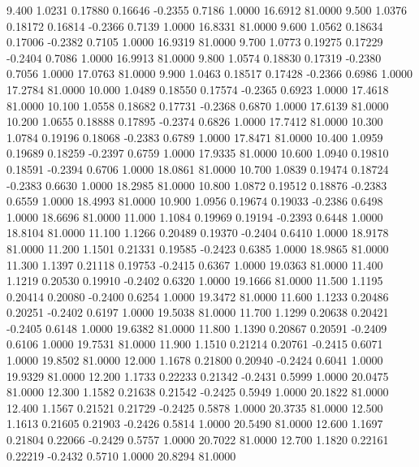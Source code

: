    9.400   1.0231   0.17880   0.16646  -0.2355   0.7186   1.0000  16.6912  81.0000
   9.500   1.0376   0.18172   0.16814  -0.2366   0.7139   1.0000  16.8331  81.0000
   9.600   1.0562   0.18634   0.17006  -0.2382   0.7105   1.0000  16.9319  81.0000
   9.700   1.0773   0.19275   0.17229  -0.2404   0.7086   1.0000  16.9913  81.0000
   9.800   1.0574   0.18830   0.17319  -0.2380   0.7056   1.0000  17.0763  81.0000
   9.900   1.0463   0.18517   0.17428  -0.2366   0.6986   1.0000  17.2784  81.0000
  10.000   1.0489   0.18550   0.17574  -0.2365   0.6923   1.0000  17.4618  81.0000
  10.100   1.0558   0.18682   0.17731  -0.2368   0.6870   1.0000  17.6139  81.0000
  10.200   1.0655   0.18888   0.17895  -0.2374   0.6826   1.0000  17.7412  81.0000
  10.300   1.0784   0.19196   0.18068  -0.2383   0.6789   1.0000  17.8471  81.0000
  10.400   1.0959   0.19689   0.18259  -0.2397   0.6759   1.0000  17.9335  81.0000
  10.600   1.0940   0.19810   0.18591  -0.2394   0.6706   1.0000  18.0861  81.0000
  10.700   1.0839   0.19474   0.18724  -0.2383   0.6630   1.0000  18.2985  81.0000
  10.800   1.0872   0.19512   0.18876  -0.2383   0.6559   1.0000  18.4993  81.0000
  10.900   1.0956   0.19674   0.19033  -0.2386   0.6498   1.0000  18.6696  81.0000
  11.000   1.1084   0.19969   0.19194  -0.2393   0.6448   1.0000  18.8104  81.0000
  11.100   1.1266   0.20489   0.19370  -0.2404   0.6410   1.0000  18.9178  81.0000
  11.200   1.1501   0.21331   0.19585  -0.2423   0.6385   1.0000  18.9865  81.0000
  11.300   1.1397   0.21118   0.19753  -0.2415   0.6367   1.0000  19.0363  81.0000
  11.400   1.1219   0.20530   0.19910  -0.2402   0.6320   1.0000  19.1666  81.0000
  11.500   1.1195   0.20414   0.20080  -0.2400   0.6254   1.0000  19.3472  81.0000
  11.600   1.1233   0.20486   0.20251  -0.2402   0.6197   1.0000  19.5038  81.0000
  11.700   1.1299   0.20638   0.20421  -0.2405   0.6148   1.0000  19.6382  81.0000
  11.800   1.1390   0.20867   0.20591  -0.2409   0.6106   1.0000  19.7531  81.0000
  11.900   1.1510   0.21214   0.20761  -0.2415   0.6071   1.0000  19.8502  81.0000
  12.000   1.1678   0.21800   0.20940  -0.2424   0.6041   1.0000  19.9329  81.0000
  12.200   1.1733   0.22233   0.21342  -0.2431   0.5999   1.0000  20.0475  81.0000
  12.300   1.1582   0.21638   0.21542  -0.2425   0.5949   1.0000  20.1822  81.0000
  12.400   1.1567   0.21521   0.21729  -0.2425   0.5878   1.0000  20.3735  81.0000
  12.500   1.1613   0.21605   0.21903  -0.2426   0.5814   1.0000  20.5490  81.0000
  12.600   1.1697   0.21804   0.22066  -0.2429   0.5757   1.0000  20.7022  81.0000
  12.700   1.1820   0.22161   0.22219  -0.2432   0.5710   1.0000  20.8294  81.0000
